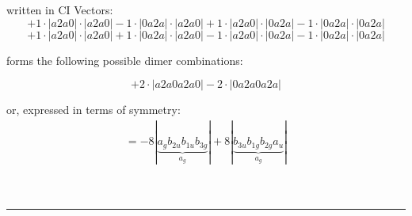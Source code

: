 \documentclass{article}
\begin{document}
\begin{minipage}{\linewidth}
written in CI Vectors: 
 $$+ 1 \cdot \left|a2a0 \right| \cdot \left| a2a0 \right| 
- 1 \cdot \left|0a2a \right| \cdot \left| a2a0 \right| 
+ 1 \cdot \left|a2a0 \right| \cdot \left| 0a2a \right| 
- 1 \cdot \left|0a2a \right| \cdot \left| 0a2a \right| 
 $$ $$ + 1 \cdot \left|a2a0 \right| \cdot \left| a2a0 \right| 
+ 1 \cdot \left|0a2a \right| \cdot \left| a2a0 \right| 
- 1 \cdot \left|a2a0 \right| \cdot \left| 0a2a \right| 
- 1 \cdot \left|0a2a \right| \cdot \left| 0a2a \right| 
$$



 forms the following possible dimer combinations:

$$+ 2 \cdot \left|a2a0a2a0 \right| - 2 \cdot \left|0a2a0a2a \right| $$



\end{minipage}
\vspace{0.5cm}


or, expressed in terms of symmetry:\begin{multline*}
=-8\left|\underbrace{a_{g} b_{2u} b_{1u} b_{3g}}_{a_{g}}\right|+8\left|\underbrace{b_{3u} b_{1g} b_{2g} a_{u}}_{a_{g}}\right|
\end{multline*}\\\\

 


\hrule
\vspace{0.5cm}
\end{document}
